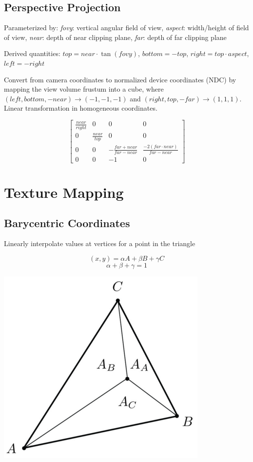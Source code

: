 \documentclass[10pt,landscape]{article}
\begin{document}
\begin{multicols}{3}
\subsection{Perspective Projection}

Parameterized by: \textit{fovy}: vertical angular field of view, \textit{aspect}: width/height of field of view, \textit{near}: depth of near clipping plane, \textit{far}: depth of far clipping plane

Derived quantities: $top = near \cdot \tan(fovy)$, $bottom = -top$, $right = top \cdot aspect$, $left = -right$

Convert from camera coordinates to normalized device coordinates (NDC) by mapping the view volume frustum into a cube, where $(left, bottom, -near) \rightarrow (-1, -1, -1)$ and $(right, top, -far) \rightarrow (1, 1, 1)$. Linear transformation in homogeneous coordinates.

$$\begin{bmatrix}
    \frac{near}{right} & 0 & 0 & 0 \\
    0 & \frac{near}{top} & 0 & 0 \\
    0 & 0 & -\frac{far+near}{far-near} & \frac{-2(far\cdot near)}{far-near}\\
    0 & 0 & -1 & 0
\end{bmatrix}$$


\section{Texture Mapping}

\subsection{Barycentric Coordinates}

Linearly interpolate values at vertices for a point in the triangle

$$(x, y) = \alpha A + \beta B + \gamma C$$
$$\alpha + \beta + \gamma = 1$$

\begin{multicols}{3}

\includegraphics[scale=0.2]{barycentric_area}


\end{multicols}
\end{multicols}
\end{document}
